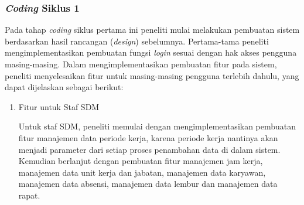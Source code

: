 	\subsubsection{\emph{Coding} Siklus 1}
	Pada tahap \emph{coding} siklus pertama ini peneliti mulai melakukan pembuatan sistem berdasarkan hasil rancangan (\emph{design}) sebelumnya. Pertama-tama peneliti mengimplementasikan pembuatan fungsi \emph{login} sesuai dengan hak akses pengguna masing-masing. Dalam mengimplementasikan pembuatan fitur pada sistem, peneliti menyelesaikan fitur untuk masing-masing pengguna terlebih dahulu, yang dapat dijelaskan sebagai berikut:
	\begin{enumerate}
	    \itemsep0em
	    \item Fitur untuk Staf SDM
	    
	    Untuk staf SDM, peneliti memulai dengan mengimplementasikan pembuatan fitur manajemen data periode kerja, karena periode kerja nantinya akan menjadi parameter dari setiap proses penambahan data di dalam sistem. Kemudian berlanjut dengan pembuatan fitur manajemen jam kerja, manajemen data unit kerja dan jabatan, manajemen data karyawan, manajemen data absensi, manajemen data lembur dan manajemen data rapat.
	    

\end{enumerate}
